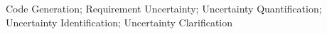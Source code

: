 \documentclass[10pt,conference]{IEEEtran}
\begin{document}
\begin{IEEEkeywords}
Code Generation;
Requirement Uncertainty;
Uncertainty Quantification;
Uncertainty Identification;
Uncertainty Clarification
\end{IEEEkeywords}













\balance
% 

\end{document}

